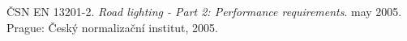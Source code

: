 \begin{thebibliography}{1}

ČSN EN 13201-2. \textit{Road lighting - Part 2: Performance requirements}. may 2005. Prague: Český normalizační institut, 2005. 

\end{thebibliography}